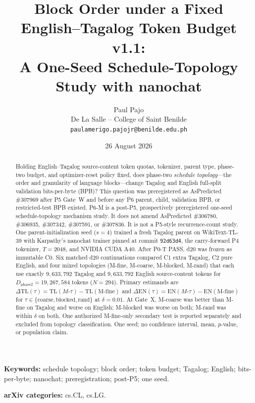 \documentclass[11pt,a4paper]{article}
\title{Block Order under a Fixed English--Tagalog Token Budget v1.1:\\
\large A One-Seed Schedule-Topology Study with nanochat}
\author{Paul Pajo\\
De La Salle -- College of Saint Benilde\\
\texttt{paulamerigo.pajojr@benilde.edu.ph}}
\date{26 August 2026}
\begin{document}
\maketitle

\begin{abstract}
Holding English--Tagalog source-content token quotas, tokenizer, parent type, phase-two budget, and optimizer-reset policy fixed, does phase-two \emph{schedule topology}---the order and granularity of language blocks---change Tagalog and English full-split validation bits-per-byte (BPB)? This question was preregistered as AsPredicted \#307969 after P5 Gate~W and before any P6 parent, child, validation BPB, or restricted-test BPB existed. P6-M is a post-P5, prospectively preregistered one-seed schedule-topology mechanism study. It does not amend AsPredicted \#306780, \#306935, \#307342, \#307591, or \#307836. It is not a P5-style recurrence-count study. One parent-initialization seed ($s=4$) trained a fresh Tagalog parent on WikiText-TL-39 with Karpathy's nanochat trainer pinned at commit \texttt{92d63d4}, the carry-forward P4 tokenizer, $T=2048$, and NVIDIA CUDA A40. After P0-T PASS, d20 was frozen as immutable C0. Six matched d20 continuations compared C1 extra Tagalog, C2 pure English, and four mixed topologies (M-fine, M-coarse, M-blocked, M-rand) that each use exactly $9{,}633{,}792$ Tagalog and $9{,}633{,}792$ English source-content tokens for $D_{\mathrm{phase2}}=19{,}267{,}584$ tokens ($N=294$). Primary estimands are $\Delta\mathrm{TL}(\tau)=\mathrm{TL}(M\textrm{-}\tau)-\mathrm{TL}(\textrm{M-fine})$ and $\Delta\mathrm{EN}(\tau)=\mathrm{EN}(M\textrm{-}\tau)-\mathrm{EN}(\textrm{M-fine})$ for $\tau\in\{\textrm{coarse},\textrm{blocked},\textrm{rand}\}$ at $\delta=0.01$. At Gate~X, M-coarse was better than M-fine on Tagalog and worse on English; M-blocked was worse on both; M-rand was within $\delta$ on both. One authorized M-fine-only secondary test is reported separately and excluded from topology classification. One seed; no confidence interval, mean, $p$-value, or population claim.
\end{abstract}

\noindent\textbf{Keywords:} schedule topology; block order; token budget; Tagalog; English; bits-per-byte; nanochat; preregistration; post-P5; one seed.

\noindent\textbf{arXiv categories:} cs.CL, cs.LG.
\end{document}

